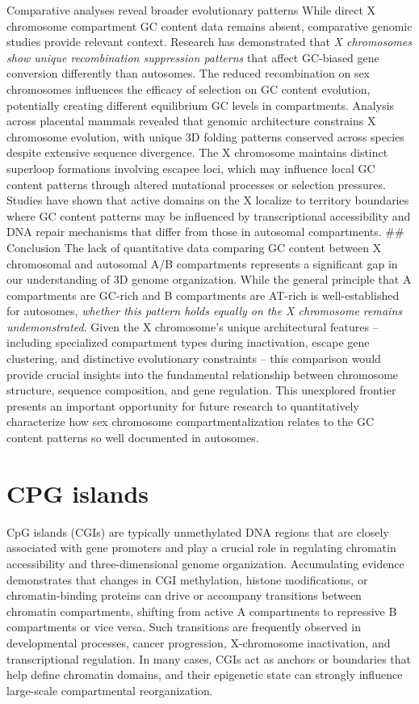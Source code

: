 \documentclass[
  a4paper,
  openany]{scrbook}
\begin{document}
Comparative analyses reveal broader evolutionary patterns While direct X
chromosome compartment GC content data remains absent, comparative
genomic studies provide relevant context. Research has demonstrated that
\emph{X chromosomes show unique recombination suppression patterns} that
affect GC-biased gene conversion differently than autosomes. The reduced
recombination on sex chromosomes influences the efficacy of selection on
GC content evolution, potentially creating different equilibrium GC
levels in compartments. Analysis across placental mammals revealed that
genomic architecture constrains X chromosome evolution, with unique 3D
folding patterns conserved across species despite extensive sequence
divergence. The X chromosome maintains distinct superloop formations
involving escapee loci, which may influence local GC content patterns
through altered mutational processes or selection pressures. Studies
have shown that active domains on the X localize to territory boundaries
where GC content patterns may be influenced by transcriptional
accessibility and DNA repair mechanisms that differ from those in
autosomal compartments. \#\# Conclusion The lack of quantitative data
comparing GC content between X chromosomal and autosomal A/B
compartments represents a significant gap in our understanding of 3D
genome organization. While the general principle that A compartments are
GC-rich and B compartments are AT-rich is well-established for
autosomes, \emph{whether this pattern holds equally on the X chromosome
remains undemonstrated}. Given the X chromosome's unique architectural
features -- including specialized compartment types during inactivation,
escape gene clustering, and distinctive evolutionary constraints -- this
comparison would provide crucial insights into the fundamental
relationship between chromosome structure, sequence composition, and
gene regulation. This unexplored frontier presents an important
opportunity for future research to quantitatively characterize how sex
chromosome compartmentalization relates to the GC content patterns so
well documented in autosomes.

\section{CPG islands}\label{cpg-islands}

CpG islands (CGIs) are typically unmethylated DNA regions that are
closely associated with gene promoters and play a crucial role in
regulating chromatin accessibility and three-dimensional genome
organization. Accumulating evidence demonstrates that changes in CGI
methylation, histone modifications, or chromatin-binding proteins can
drive or accompany transitions between chromatin compartments, shifting
from active A compartments to repressive B compartments or vice versa.
Such transitions are frequently observed in developmental processes,
cancer progression, X-chromosome inactivation, and transcriptional
regulation. In many cases, CGIs act as anchors or boundaries that help
define chromatin domains, and their epigenetic state can strongly
influence large-scale compartmental reorganization.
\end{document}
